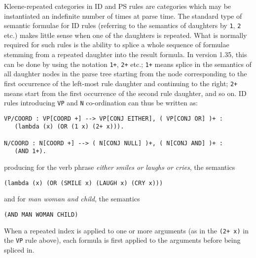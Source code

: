 Kleene-repeated categories in ID and PS rules are categories which may
be instantiated an indefinite number of times at parse time. The standard
type of semantic formulae for ID rules (referring to the semantics of
daughters by {\tt 1}, {\tt 2} etc.) makes little sense when one of the daughters is
repeated. What is normally required for such rules is the ability to splice
a whole sequence of formulae stemming from a repeated daughter into the result
formula. In version 1.35, this can be done by using the notation
{\tt 1+}, {\tt 2+} etc.; {\tt 1+} means splice in the semantics of
all daughter nodes in
the parse tree starting from the node corresponding to the first occurrence
of the left-most rule daughter and continuing to the right; {\tt 2+} means start
from the first occurrence of the second rule daughter, and so on.
ID rules introducing {\tt VP} and {\tt N} co-ordination can thus be written as:
\begin{ex}
\begin{verbatim}
VP/COORD : VP[COORD +] --> VP[CONJ EITHER], ( VP[CONJ OR] )+ :
   (lambda (x) (OR (1 x) (2+ x))).

N/COORD : N[COORD +] --> ( N[CONJ NULL] )+, ( N[CONJ AND] )+ :
   (AND 1+).
\end{verbatim}
\end{ex}
producing for the verb phrase {\it either smiles or laughs or cries}, the semantics
\begin{ex}
\begin{verbatim}
(lambda (x) (OR (SMILE x) (LAUGH x) (CRY x)))
\end{verbatim}
\end{ex}
and for {\it man woman and child}, the semantics
\begin{ex}
\begin{verbatim}
(AND MAN WOMAN CHILD)
\end{verbatim}
\end{ex}
When a repeated index is applied to one or more arguments (as in the
{\tt (2+ x)} in the {\tt VP} rule above), each formula is first applied to the
arguments before being spliced in.

